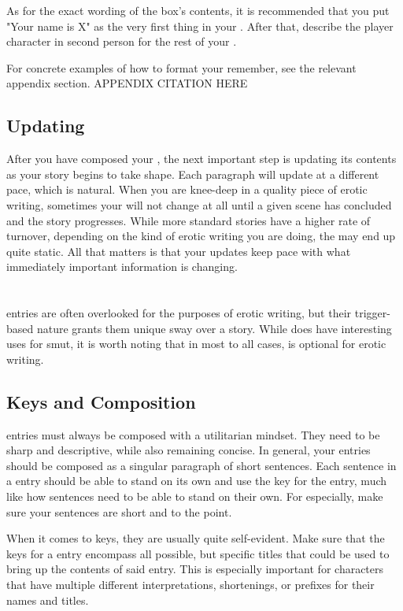 ﻿\documentclass[Coomer-main.tex]{subfiles}
\begin{document}
As for the exact wording of the \rem box's contents, it is recommended that you put "Your name is X" as the very first thing in your \rem.
After that, describe the player character in second person for the rest of your \rem.

For concrete examples of how to format your remember, see the relevant appendix section. APPENDIX CITATION HERE

\section{Updating}

After you have composed your \rem, the next important step is updating its contents as your story begins to take shape.
Each paragraph will update at a different pace, which is natural.
When you are knee-deep in a quality piece of erotic writing, sometimes your \rem will not change at all until a given scene has concluded and the story progresses.
While more standard stories have a higher rate of \rem turnover, depending on the kind of erotic writing you are doing, the \rem may end up quite static.
All that matters is that your updates keep pace with what immediately important information is changing.

\chapter{\wi}
\label{ch:wi}

\wi entries are often overlooked for the purposes of erotic writing, but their trigger-based nature grants them unique sway over a story.
While \wi does have interesting uses for smut, it is worth noting that in most to all cases, \wi is optional for erotic writing.

\section{Keys and Composition}

\wi entries must always be composed with a utilitarian mindset.
They need to be sharp and descriptive, while also remaining concise.
In general, your entries should be composed as a singular paragraph of short sentences.
Each sentence in a \wi entry should be able to stand on its own and use the key for the entry, much like how \rem sentences need to be able to stand on their own.
For \wi especially, make sure your sentences are short and to the point.

When it comes to keys, they are usually quite self-evident.
Make sure that the keys for a \wi entry encompass all possible, but specific titles that could be used to bring up the contents of said entry.
This is especially important for characters that have multiple different interpretations, shortenings, or prefixes for their names and titles.
\end{document}
